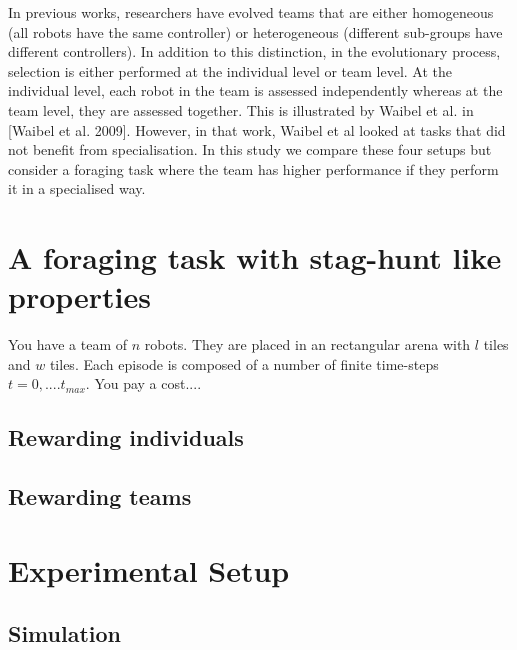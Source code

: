 \documentclass[sigconf]{aamas}  %
\begin{document}
In previous works, researchers have evolved teams that are either homogeneous (all robots have the same controller) or heterogeneous (different sub-groups have different controllers). 
In addition to this distinction, in the evolutionary process, selection is either performed at the individual level or team level. 
At the individual level, each robot in the team is assessed independently whereas at the team level, they are assessed together. 
This is illustrated by Waibel et al. in [Waibel et al. 2009]. 
However, in that work, Waibel et al looked at tasks that did not benefit from specialisation. 
In this study we compare these four setups but consider a foraging task where the team has higher performance if they perform it in a specialised way.


\section{A foraging task with stag-hunt like properties \label{setup}}


You have a team of $n$ robots. They are placed in an rectangular arena  with $l$ tiles and $w$ tiles. Each episode is composed of a number of finite time-steps $t=0, .... t_{max}$.
You pay a cost....

\subsection{Rewarding individuals}

\subsection{Rewarding teams}



\section{Experimental Setup \label{setup}}

\subsection{Simulation}
\end{document}
